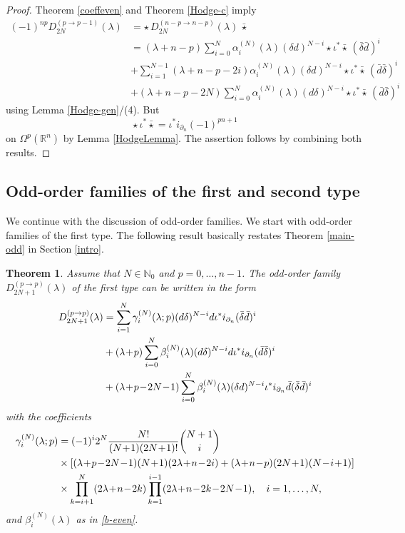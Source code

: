 \documentclass[a4paper,12pt,reqno]{amsart}
\newtheorem{theorem}{Theorem}
\numberwithin{theorem}{subsection}
\numberwithin{equation}{section}
\begin{document}
\begin{proof} Theorem \ref{coeffeven} and Theorem \ref{Hodge-c} imply
\begin{align*}
   (-1)^{np} D_{2N}^{(p \to p-1)}(\lambda) & = \star \, D_{2N}^{(n-p \to n-p)}(\lambda) \, \bar{\star} \\
   & = (\lambda\!+\!n\!-\!p) \sum_{i=0}^N \alpha_i^{(N)}(\lambda)
   (\delta {d})^{N-i} \star \iota^* \bar{\star} \, (\bar{\delta} \bar{d} )^i \\
   & + \sum_{i=1}^{N-1} (\lambda\!+\!n\!-\!p\!-\!2i) \alpha_i^{(N)}(\lambda)
   (\delta{d} )^{N-i} \star \iota^* \bar{\star} \, (\bar{d}\bar{\delta})^i \\
   & + (\lambda\!+\!n\!-\!p\!-\!2N) \sum_{i=0}^N \alpha_i^{(N)}(\lambda)
   ({d} \delta)^{N-i} \star \iota^* \bar{\star} \, (\bar{d}\bar{\delta})^i
\end{align*}
using Lemma \ref{Hodge-gen}/(4). But
$$
   \star \, \iota^* \bar{\star} = \iota^* i_{\partial_n} (-1)^{pn+1}
$$
on $\Omega^p({\mathbb{R}}^n)$ by Lemma \ref{HodgeLemma}. The assertion follows by
combining both results.
\end{proof}

\subsection{Odd-order families of the first and second type}\label{case-odd}

We continue with the discussion of odd-order families. We start with odd-order
families of the first type. The following result basically restates Theorem
\ref{main-odd} in Section \ref{intro}.

\begin{theorem}\label{coeffodd2} Assume that $N \in {\mathbb{N}}_0$ and $p=0,\dots,n-1$. The odd-order family
$D^{(p \to p)}_{2N+1}(\lambda)$ of the first type can be written in the form
\begin{align}
   D^{(p\to p)}_{2N+1}(\lambda)
   & = \sum_{i=1}^N  \gamma_i^{(N)}(\lambda;p) ({d} \delta)^{N-i} {d} \iota^* i_{\partial_n}
   (\bar{\delta}\bar{d})^i \notag \\
   & + (\lambda\!+\!p) \sum_{i=0}^N  \beta_i^{(N)}(\lambda)
   ({d}\delta)^{N-i}{d} \iota^*i_{\partial_n}(\bar{d}\bar{\delta})^i \notag \\
   & + (\lambda\!+\!p\!-\!2N\!-\!1) \sum_{i=0}^N \beta_i^{(N)}(\lambda)
   (\delta{d})^{N-i} \iota^*i_{\partial_n} \bar{d}(\bar{\delta}\bar{d})^i
\end{align}
with the coefficients
\begin{align}\label{a-coeff-odd}
   \gamma_i^{(N)}(\lambda;p) & = (-1)^i 2^N \frac{N!}{(N\!+\!1)(2N\!+\!1)!} \binom{N+1}{i} \notag \\
   & \times \left[(\lambda\!+\!p\!-\!2N\!-\!1)(N\!+\!1)(2\lambda\!+\!n\!-\!2i) +
   (\lambda\!+\!n\!-\!p)(2N\!+\!1)(N\!-\!i\!+\!1) \right] \notag \\
   & \times \prod_{k=i+1}^N (2\lambda\!+\!n\!-\!2k) \prod_{k=1}^{i-1}
   (2\lambda\!+\!n\!-\!2k\!-\!2N\!-\!1), \quad i=1,\dots,N,
\end{align}
and $\beta_i^{(N)}(\lambda)$ as in \eqref{b-even}.
\end{theorem}
\end{document}
